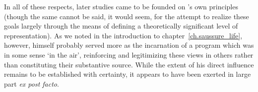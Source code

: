 In all of these respects, later studies came to be founded on
{\Saussure}'s own principles (though the same cannot be said, it would
seem, for the attempt to realize these goals largely through the means
of defining a theoretically significant level of representation). As
we noted in the introduction to chapter~\ref{ch.saussure_life},
however, {\Saussure} himself probably served more as the incarnation of a
program which was in some sense `in the air', reinforcing and
legitimizing these views in others rather than constituting their
substantive source. While the extent of his direct influence remains
to be established with certainty, it appears to have been exerted in
large part \textit{ex post facto}.

